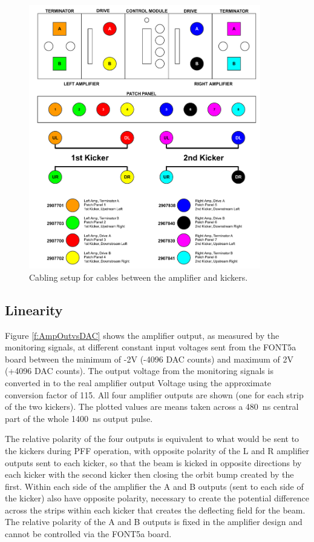 \begin{figure}
  \centering
  \includegraphics[width=0.9\textwidth]{Figures/commissioning/kickerCables}
  \caption{Cabling setup for cables between the amplifier and kickers.}
  \label{f:kickerCables}
\end{figure}


\subsection{Linearity}
\label{ss:ampLin}

Figure \ref{f:AmpOutvsDAC} shows the amplifier output, as measured by the monitoring signals, at different constant input voltages sent from the FONT5a board between the minimum of -2V (-4096 DAC counts) and maximum of 2V (+4096 DAC counts). The output voltage from the monitoring signals is converted in to the real amplifier output Voltage using the approximate conversion factor of 115. All four amplifier outputs are shown (one for each strip of the two kickers). The plotted values are means taken across a 480~ns central part of the whole 1400~ns output pulse.

The relative polarity of the four outputs is equivalent to what would be sent to the kickers during PFF operation, with opposite polarity of the L and R amplifier outputs sent to each kicker, so that the beam is kicked in opposite directions by each kicker with the second kicker then closing the orbit bump created by the first. Within each side of the amplifier the A and B outputs (sent to each side of the kicker) also have opposite polarity, necessary to create the potential difference across the strips within each kicker that creates the deflecting field for the beam. The relative polarity of the A and B outputs is fixed in the amplifier design and cannot be controlled via the FONT5a board.

